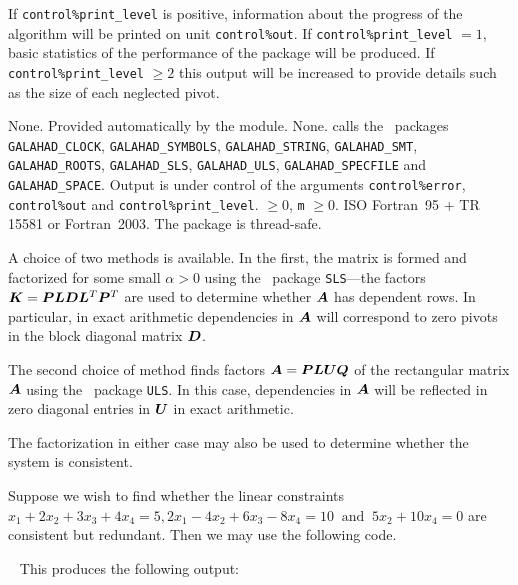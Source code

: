 \documentclass{galahad}
\newcommand{\packagename}{FDC}
\begin{document}

\galinfo
If {\tt control\%print\_level} is positive, information about the progress
of the algorithm will be printed on unit {\tt control\-\%out}.
If {\tt control\%print\_level} $= 1$, basic statistics of the performance of the
package will be produced.
If {\tt control\-\%print\_level} $\geq 2$ this
output will be increased to provide details such as the size of each
neglected pivot.


\galgeneral

\galcommon None.
\galworkspace Provided automatically by the module.
\galroutines None.
\galmodules {\tt \packagename\_find\_dependent} calls the \galahad\ packages
{\tt GALAHAD\_CLOCK},
{\tt GALAHAD\_SY\-M\-BOLS},
{\tt GALAHAD\_STRING},
{\tt GALAHAD\_SMT}, {\tt GALAHAD\_\-ROOTS}, {\tt GALAHAD\_\-SLS},
{\tt GALAHAD\_\-ULS}, {\tt GALAHAD\_SPECFILE} and {\tt GALAHAD\_SPACE}.
\galio Output is under control of the arguments
 {\tt control\%error}, {\tt control\%out} and {\tt control\%print\_level}.
 $\geq 0$, {\tt m} $\geq  0$.
\galportability ISO Fortran~95 + TR 15581 or Fortran~2003.
The package is thread-safe.


\galmethod

A choice of two methods is available. In the first, the matrix
is formed and factorized for some small $\alpha > 0$ using the
\libraryname\ package {\tt SLS}---the
factors ${\bm{K}} = {\bm{P}} {\bm{L}} {\bm{D}} {\bm{L}}^T {\bm{P}}^T$ are used to determine
whether ${\bm{A}}$ has dependent rows. In particular, in exact arithmetic
dependencies in ${\bm{A}}$ will correspond to zero pivots in the block
diagonal matrix ${\bm{D}}$.

The second choice of method finds factors
${\bm{A}} = {\bm{P}} {\bm{L}} {\bm{U}} {\bm{Q}}$ of the rectangular matrix ${\bm{A}}$
using the \libraryname\ package {\tt ULS}.
In this case, dependencies in ${\bm{A}}$ will be reflected in zero diagonal
entries in ${\bm{U}}$ in exact arithmetic.

The factorization in either case may also be used to
determine whether the system is consistent.


\galexample
Suppose we wish to find whether the linear constraints
$x_1 + 2 x_2 + 3 x_3 + 4 x_4 = 5, 2 x_1 - 4 x_2 + 6 x_3 - 8 x_4 = 10
\;\; \mbox{and} \;\; 5 x_2 + 10 x_4 = 0$
are consistent but redundant.
Then we may use the following code.

{\tt \small
\VerbatimInput{\packageexample}
}
\noindent
This produces the following output:
{\tt \small
\VerbatimInput{\packageresults}
}
\end{document}
